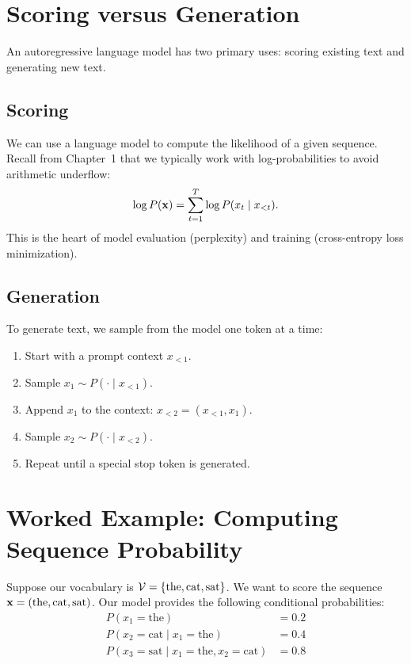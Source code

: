 \section{Scoring versus Generation}

An autoregressive language model has two primary uses: scoring existing text and generating new text.

\subsection{Scoring}
\label{ch:06:sec:scoring}
We can use a language model to compute the likelihood of a given sequence. Recall from Chapter~1 that we typically work with log-probabilities to avoid arithmetic underflow:
\begin{equation}
\label{eq:06:log_prob}
\log P(\mathbf{x}) = \sum_{t=1}^T \log P(x_t \mid x_{<t}).
\end{equation}
This is the heart of model evaluation (perplexity) and training (cross-entropy loss minimization).

\subsection{Generation}
\label{ch:06:sec:generation}
To generate text, we sample from the model one token at a time:
\begin{enumerate}
    \item Start with a prompt context $x_{<1}$.
    \item Sample $x_1 \sim P(\cdot \mid x_{<1})$.
    \item Append $x_1$ to the context: $x_{<2} = (x_{<1}, x_1)$.
    \item Sample $x_2 \sim P(\cdot \mid x_{<2})$.
    \item Repeat until a special stop token is generated.
\end{enumerate}

\section{Worked Example: Computing Sequence Probability}
\label{ch:06:sec:example}

Suppose our vocabulary is $\mathcal{V} = \{\text{the}, \text{cat}, \text{sat}\}$. We want to score the sequence $\mathbf{x} = (\text{the}, \text{cat}, \text{sat})$. Our model provides the following conditional probabilities:
\begin{align*}
    P(x_1 = \text{the}) &= 0.2 \\
    P(x_2 = \text{cat} \mid x_1 = \text{the}) &= 0.4 \\
    P(x_3 = \text{sat} \mid x_1 = \text{the}, x_2 = \text{cat}) &= 0.8
\end{align*}


